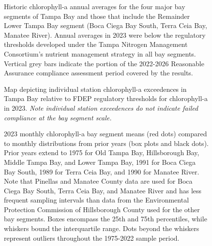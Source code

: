 \documentclass[
  letterpaper,
  DIV=11,
  numbers=noendperiod]{scrreport}
\begin{document}
\begin{figure}


\caption{\label{fig-thrplot}Historic chlorophyll-a annual averages for
the four major bay segments of Tampa Bay and those that include the
Remainder Lower Tampa Bay segment (Boca Ciega Bay South, Terra Ceia Bay,
Manatee River). Annual averages in 2023 were below the regulatory
thresholds developed under the Tampa Nitrogen Management Consortium's
nutrient management strategy in all bay segments. Vertical grey bars
indicate the portion of the 2022-2026 Reasonable Assurance compliance
assessment period covered by the results.}

\end{figure}%

\begin{figure}


\caption{\label{fig-sitemap}Map depicting individual station
chlorophyll-a exceedences in Tampa Bay relative to FDEP regulatory
thresholds for chlorophyll-a in 2023. \emph{Note individual station
exceedences do not indicate failed compliance at the bay segment
scale.}}

\end{figure}%

\begin{figure}


\caption{\label{fig-boxplot}2023 monthly chlorophyll-a bay segment means
(red dots) compared to monthly distributions from prior years (box plots
and black dots). Prior years extend to 1975 for Old Tampa Bay,
Hillsborough Bay, Middle Tampa Bay, and Lower Tampa Bay, 1991 for Boca
Ciega Bay South, 1989 for Terra Ceia Bay, and 1990 for Manatee River.
Note that Pinellas and Manatee County data are used for Boca Ciega Bay
South, Terra Ceia Bay, and Manatee River and has less frequent sampling
intervals than data from the Environmental Protection Commission of
Hillsborough County used for the other bay segments. Boxes encompass the
25th and 75th percentiles, while whiskers bound the interquartile range.
Dots beyond the whiskers represent outliers throughout the 1975-2022
sample period.}

\end{figure}%
\end{document}
